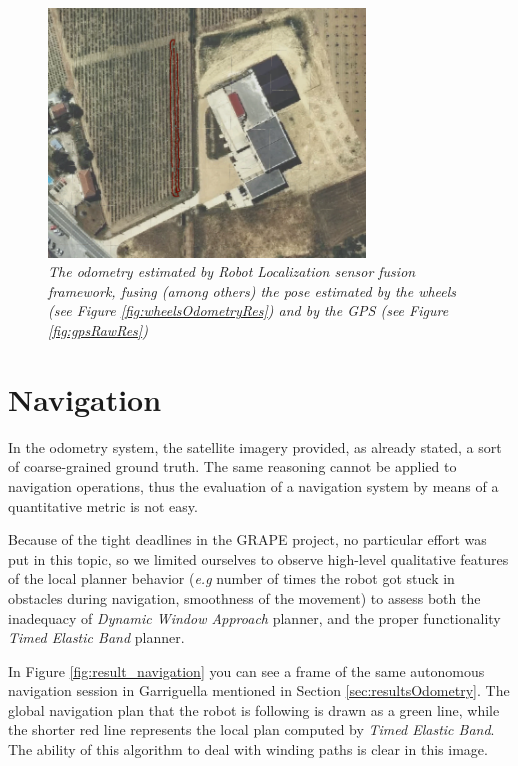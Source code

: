 \begin{figure}
	\centering
	\includegraphics[width=0.75\textwidth]{Images/experimental_data/rob_loc_result.png}
	\caption{\textit{The odometry estimated by Robot Localization sensor fusion framework, fusing (among others) the pose estimated by the wheels (see Figure \ref{fig:wheelsOdometryRes}) and by the GPS (see Figure \ref{fig:gpsRawRes})}}
	\label{fig:robLocResult}
\end{figure}

\section{Navigation}

In the odometry system, the satellite imagery provided, as already stated, a sort of coarse-grained ground truth. The same reasoning cannot be applied to navigation operations, thus the evaluation of a navigation system by means of a quantitative metric is not easy.
	\par Because of the tight deadlines in the \ac{GRAPE} project, no particular effort was put in this topic, so we limited ourselves to observe high-level qualitative features of the local planner behavior (\textit{e.g} number of times the robot got stuck in obstacles during navigation, smoothness of the movement) to assess both the inadequacy of \textit{Dynamic Window Approach} planner, and the proper functionality \textit{Timed Elastic Band} planner.
	\par In Figure \ref{fig:result_navigation} you can see a frame of the same autonomous navigation session in Garriguella mentioned in Section \ref{sec:resultsOdometry}. The global navigation plan that the robot is following is drawn as a green line, while the shorter red line represents the local plan computed by  \textit{Timed Elastic Band}. The ability of this algorithm to deal with winding paths is clear in this image.

